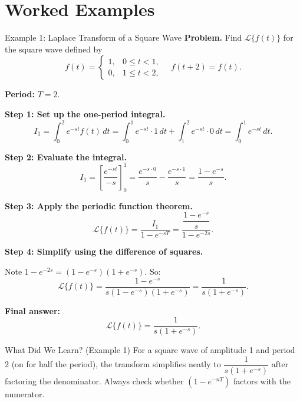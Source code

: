 \documentclass[12pt,a4paper]{article}
\begin{document}
\section{Worked Examples}

\begin{infobox}{Example 1: Laplace Transform of a Square Wave}
\textbf{Problem.} Find $\mathcal{L}\{f(t)\}$ for the square wave defined by
\[
  f(t) = \begin{cases} 1, & 0 \le t < 1, \\ 0, & 1 \le t < 2, \end{cases}
  \quad f(t+2) = f(t).
\]

\textbf{Period:} $T = 2$.

\textbf{Step 1: Set up the one-period integral.}
\[
  I_1 = \int_0^2 e^{-st} f(t)\,dt
  = \int_0^1 e^{-st} \cdot 1\,dt + \int_1^2 e^{-st} \cdot 0\,dt
  = \int_0^1 e^{-st}\,dt.
\]

\textbf{Step 2: Evaluate the integral.}
\[
  I_1 = \left[\frac{e^{-st}}{-s}\right]_0^1
  = \frac{e^{-s \cdot 0}}{s} - \frac{e^{-s \cdot 1}}{s}
  = \frac{1 - e^{-s}}{s}.
\]

\textbf{Step 3: Apply the periodic function theorem.}
\[
  \mathcal{L}\{f(t)\}
  = \frac{I_1}{1 - e^{-sT}}
  = \frac{\dfrac{1-e^{-s}}{s}}{1 - e^{-2s}}.
\]

\textbf{Step 4: Simplify using the difference of squares.}

Note $1 - e^{-2s} = (1 - e^{-s})(1 + e^{-s})$. So:
\[
  \mathcal{L}\{f(t)\}
  = \frac{1 - e^{-s}}{s(1 - e^{-s})(1 + e^{-s})}
  = \frac{1}{s(1 + e^{-s})}.
\]

\textbf{Final answer:}
\[
  \mathcal{L}\{f(t)\} = \frac{1}{s(1 + e^{-s})}.
\]
\end{infobox}

\begin{learnbox}{What Did We Learn? (Example 1)}
For a square wave of amplitude 1 and period 2 (on for half the period), the
transform simplifies neatly to $\dfrac{1}{s(1+e^{-s})}$ after factoring the
denominator. Always check whether $(1-e^{-nT})$ factors with the numerator.
\end{learnbox}
\end{document}
